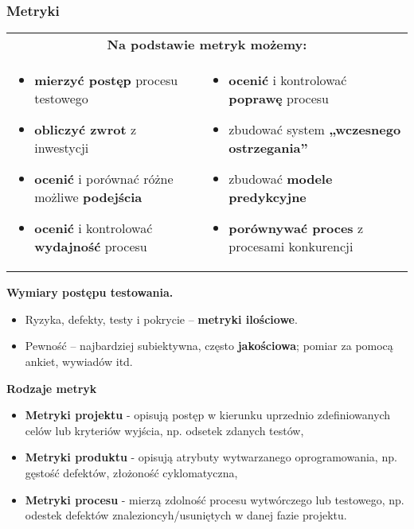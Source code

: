 \documentclass[../main.tex]{subfiles}
\begin{document}
    \subsubsection{Metryki}
    \begin{table}[H]
        \begin{center}
            \begin{tabular}{p{8cm} p{8cm}}
                \multicolumn{2}{c}{\textbf{ Na podstawie metryk możemy:}}\\
                \begin{itemize}
                    \item \textbf{mierzyć postęp} procesu testowego
                    \item \textbf{obliczyć zwrot} z inwestycji
                    \item \textbf{ocenić} i porównać różne możliwe \textbf{podejścia}
                    \item \textbf{ocenić} i kontrolować \textbf{wydajność} procesu
                \end{itemize}
                &
                \begin{itemize}
                    \item \textbf{ocenić} i kontrolować \textbf{poprawę} procesu
                    \item zbudować system \textbf{„wczesnego ostrzegania”}
                    \item zbudować \textbf{modele predykcyjne}
                    \item \textbf{porównywać proces} z procesami konkurencji
                \end{itemize}\\
            \end{tabular}
        \end{center}
    \end{table}

    \textbf{Wymiary postępu testowania.}
    \begin{itemize}
        \item Ryzyka, defekty, testy i pokrycie – \textbf{metryki ilościowe}.
        \item Pewność – najbardziej subiektywna, często \textbf{jakościowa}; pomiar za pomocą ankiet, wywiadów itd.
    \end{itemize}

    \textbf{Rodzaje metryk}
    \begin{itemize}
        \item \textbf{Metryki projektu} - opisują postęp w kierunku uprzednio zdefiniowanych celów lub kryteriów
        wyjścia, np. odsetek zdanych testów,
        \item \textbf{Metryki produktu} - opisują atrybuty wytwarzanego oprogramowania, np. gęstość defektów, złożoność cyklomatyczna,
        \item \textbf{Metryki procesu} - mierzą zdolność procesu wytwórczego lub testowego, np. odestek defektów znalezioncyh/usuniętych
        w danej fazie projektu.
    \end{itemize}
\end{document}
